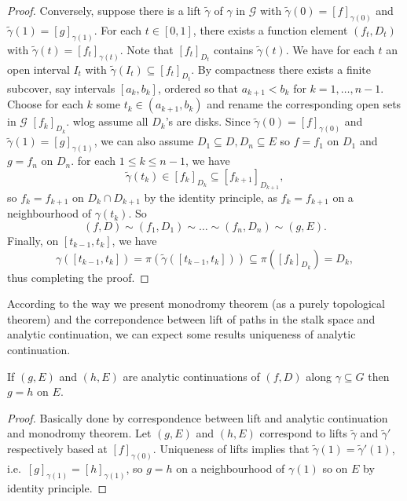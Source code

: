 \documentclass[a4paper]{article}
\begin{document}
\begin{proof}
  Conversely, suppose there is a lift \(\tilde \gamma\) of \(\gamma\) in \(\mathcal G\) with \(\tilde \gamma(0) = [f]_{\gamma(0)}\) and \(\tilde \gamma(1) = [g]_{\gamma(1)}\). For each \(t \in [0, 1]\), there exists a function element \((f_t, D_t)\) with \(\tilde \gamma(t) = [f_t]_{\gamma(t)}\). Note that \([f_t]_{D_t}\) contains \(\tilde \gamma(t)\). We have for each \(t\) an open interval \(I_t\) with \(\tilde \gamma(I_t) \subseteq [f_t]_{D_t}\). By compactness there exists a finite subcover, say intervals \([a_k, b_k]\), ordered so that \(a_{k + 1} < b_k\) for \(k = 1, \dots, n - 1\). Choose for each \(k\) some \(t_k \in (a_{k + 1}, b_k)\) and rename the corresponding open sets in \(\mathcal G\) \([f_k]_{D_k}\). wlog assume all \(D_k\)'s are disks. Since \(\tilde \gamma(0) = [f]_{\gamma(0)}\) and \(\tilde \gamma(1) = [g]_{\gamma(1)}\), we can also assume \(D_1 \subseteq D, D_n \subseteq E\) so \(f = f_1\) on \(D_1\) and \(g = f_n\) on \(D_n\). for each \(1 \leq k \leq n - 1\), we have
  \[
    \tilde \gamma(t_k) \in [f_k]_{D_k} \subseteq [f_{k + 1}]_{D_{k + 1}},
  \]
  so \(f_k = f_{k + 1}\) on \(D_k \cap D_{k + 1}\) by the identity principle, as \(f_k = f_{k + 1}\) on a neighbourhood of \(\gamma(t_k)\). So
  \[
    (f, D) \sim (f_1, D_1) \sim \dots \sim (f_n, D_n) \sim (g, E).
  \]
  Finally, on \([t_{k - 1}, t_k]\), we have
  \[
    \gamma([t_{k - 1}, t_k]) = \pi(\tilde \gamma([t_{k -1}, t_k])) \subseteq \pi([f_k]_{D_k}) = D_k,
  \]
  thus completing the proof.
\end{proof}

According to the way we present monodromy theorem (as a purely topological theorem) and the correpondence between lift of paths in the stalk space and analytic continuation, we can expect some results uniqueness of analytic continuation.

\begin{proposition}
  If \((g, E)\) and \((h, E)\) are analytic continuations of \((f, D)\) along \(\gamma \subseteq G\) then \(g = h\) on \(E\).
\end{proposition}

\begin{proof}
  Basically done by correspondence between lift and analytic continuation and monodromy theorem. Let \((g, E)\) and \((h, E)\) correspond to lifts \(\tilde \gamma\) and \(\tilde \gamma'\) respectively based at \([f]_{\gamma(0)}\). Uniqueness of lifts implies that \(\tilde \gamma(1) = \tilde \gamma'(1)\), i.e.\ \([g]_{\gamma(1)} = [h]_{\gamma(1)}\), so \(g = h\) on a neighbourhood of \(\gamma(1)\) so on \(E\) by identity principle.
\end{proof}
\end{document}
